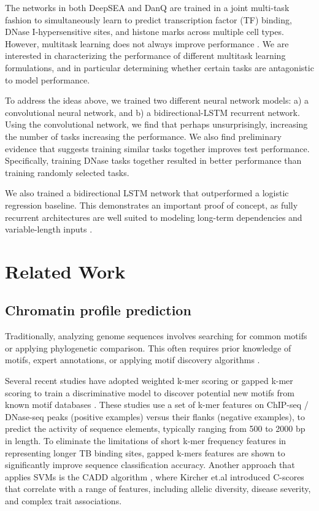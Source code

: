 \documentclass{article}
\begin{document}
The networks in both DeepSEA and DanQ are trained in a joint multi-task fashion to simultaneously learn to predict transcription factor (TF) binding, DNase I-hypersensitive sites, and histone marks across multiple cell types. However, multitask learning does not always improve performance \cite{caruana1998multitask}.  We are interested in characterizing the performance of different multitask learning formulations, and in particular determining whether certain tasks are antagonistic to model performance.

To address the ideas above, we trained two different neural network models: a) a convolutional neural network, and b) a bidirectional-LSTM recurrent network.  Using the convolutional network, we find that perhaps unsurprisingly, increasing the number of tasks increasing the performance.  We also find preliminary evidence that suggests training similar tasks together improves test performance.  Specifically, training DNase tasks together resulted in better performance than training randomly selected tasks.

We also trained a bidirectional LSTM network that outperformed a logistic regression baseline.  This demonstrates an important proof of concept, as fully recurrent architectures are well suited to modeling long-term dependencies and variable-length inputs \cite{zhou2016deep} \cite{cho2014learning} \cite{kalchbrenner2013recurrent} \cite{sutskever2014sequence}.

\section{Related Work}

\subsection{Chromatin profile prediction}
Traditionally, analyzing genome sequences involves searching for common motifs or applying phylogenetic comparison.  This often requires prior knowledge of motifs, expert annotations, or applying motif discovery algorithms \cite{jaspar} \cite{wang2012sequence}.
 
Several recent studies have adopted weighted k-mer scoring or gapped k-mer scoring to train a discriminative model to discover potential new motifs from known motif databases \cite{ghandi2014enhanced} \cite{lee2016ls} \cite{choi2002analysis}.  These studies use a set of k-mer features on ChIP-seq / DNase-seq peaks (positive examples) versus their flanks (negative examples), to predict the activity of sequence elements, typically ranging from 500 to 2000 bp in length. To eliminate the limitations of short k-mer frequency features in representing longer TB binding sites, gapped k-mers features are shown to significantly improve sequence classification accuracy.\cite{ghandi2014enhanced}  Another approach that applies SVMs is the CADD algorithm \cite{kircher2014general}, where Kircher et.al introduced C-scores that correlate with a range of features, including allelic diversity, disease severity, and complex trait associations.
\end{document}
